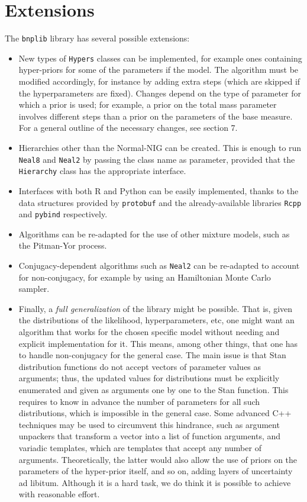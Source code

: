 \chapter{Extensions}
The \verb|bnplib| library has several possible extensions:
\begin{itemize}
	\item New types of \verb|Hypers| classes can be implemented, for example ones containing hyper-priors for some of the parameters if the model.
	The algorithm must be modified accordingly, for instance by adding extra steps (which are skipped if the hyperparameters are fixed).
	Changes depend on the type of parameter for which a prior is used; for example, a prior on the total mass parameter involves different steps than a prior on the parameters of the base measure.
	For a general outline of the necessary changes, see \cite{neal} section 7.
	\item Hierarchies other than the Normal-NIG can be created.
	This is enough to run \verb|Neal8| and \verb|Neal2| by passing the class name as parameter, provided that the \verb|Hierarchy| class has the appropriate interface.
	\item Interfaces with both R and Python can be easily implemented, thanks to the data structures provided by \verb|protobuf| and the already-available libraries \verb|Rcpp| and \verb|pybind| respectively.
	\item Algorithms can be re-adapted for the use of other mixture models, such as the Pitman-Yor process.
	\item Conjugacy-dependent algorithms such as \verb|Neal2| can be re-adapted to account for non-conjugacy, for example by using an Hamiltonian Monte Carlo sampler.
	\item Finally, a \emph{full generalization} of the library might be possible.
	That is, given the distributions of the likelihood, hyperparameters, etc, one might want an algorithm that works for the chosen specific model without needing and explicit implementation for it.
	This means, among other things, that one has to handle non-conjugacy for the general case.
	The main issue is that Stan distribution functions do not accept vectors of parameter values as arguments; thus, the updated values for distributions must be explicitly enumerated and given as arguments one by one to the Stan function.
	This requires to know in advance the number of parameters for all such distributions, which is impossible in the general case.
	Some advanced C++ techniques may be used to circumvent this hindrance, such as argument unpackers that transform a vector into a list of function arguments, and variadic templates, which are templates that accept any number of arguments.
	Theoretically, the latter would also allow the use of priors on the parameters of the hyper-prior itself, and so on, adding layers of uncertainty ad libitum.
	Although it is a hard task, we do think it is possible to achieve with reasonable effort.
\end{itemize}
